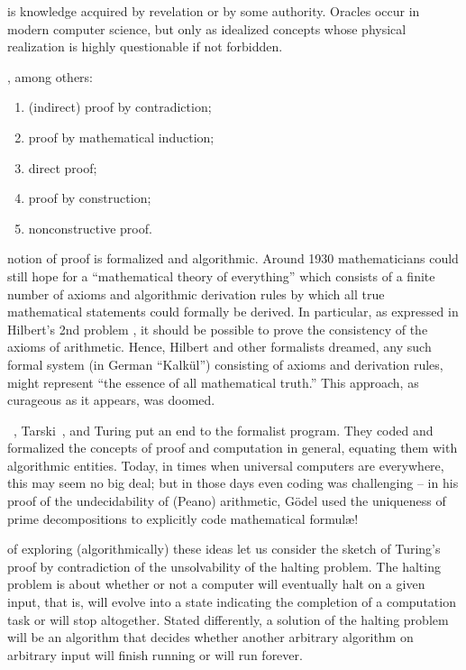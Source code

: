  is knowledge acquired by revelation or by some authority.
Oracles occur in modern computer science,
but only as idealized concepts whose physical realization is highly
questionable if not forbidden.

, among others:
\begin{enumerate}
\item
(indirect) proof by contradiction;
\item
proof by mathematical induction;
\item
direct proof;
\item
proof by construction;
\item
nonconstructive proof.
\end{enumerate}


 notion of proof is formalized and algorithmic.
Around 1930 mathematicians could still hope for a
``mathematical theory of everything''
which consists of a finite number of axioms and algorithmic derivation rules
by which all true mathematical statements could formally be derived.
In particular, as expressed in Hilbert's 2nd problem \citep{hilbert-1900e},
it should be possible to prove the consistency of the axioms of arithmetic.
Hence, Hilbert and other formalists dreamed, any such formal system (in German
``Kalk\"ul'') consisting of axioms and derivation rules, might
represent ``the essence of all mathematical truth.''
This approach, as curageous as it appears, was doomed.

~\cite{godel1}, Tarski~\cite{tarski:32}, and Turing
\cite{turing-36} put an end to the formalist program.
They coded and  formalized the concepts of proof and computation in general,
equating them with algorithmic entities.
Today, in times when universal computers are everywhere, this may seem no big deal;
but in those days even coding was challenging -- in his proof
of the undecidability of (Peano) arithmetic,
G\"odel used the uniqueness of prime decompositions to explicitly code mathematical formul\ae!

 of exploring (algorithmically) these ideas
let us consider the sketch of Turing's proof by contradiction
of the unsolvability of the halting problem.
The halting problem is about whether or not a computer will eventually halt on a given input,
that is, will evolve into a state indicating the completion of a computation task or will stop altogether.
Stated differently, a solution of the halting problem will be an algorithm that
decides whether another arbitrary algorithm on arbitrary input will finish running or will run forever.

